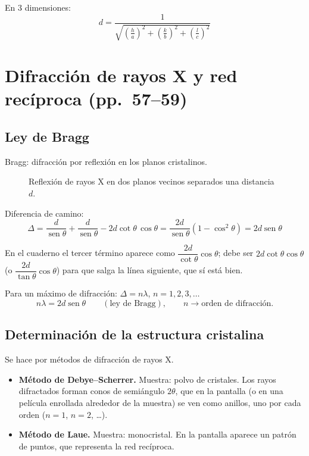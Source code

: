 \documentclass[11pt,a4paper]{article}
\newcommand{\pags}[1]{{\normalfont\small\color{gris}(pp.~#1)}}
\DeclareMathOperator{\sen}{sen}
\begin{document}
En 3 dimensiones:
\[
\boxed{d=\frac{1}{\sqrt{\left(\frac ha\right)^2+\left(\frac kb\right)^2+\left(\frac lc\right)^2}}}
\]

\section{Difracción de rayos X y red recíproca \pags{57--59}}

\subsection{Ley de Bragg}
Bragg: difracción por reflexión en los planos cristalinos.

\begin{figure}[H]
\centering
{}
\caption{Reflexión de rayos X en dos planos vecinos separados una distancia $d$.}
\end{figure}

Diferencia de camino:
\[
\Delta=\frac{d}{\sen\theta}+\frac{d}{\sen\theta}-2d\cot\theta\,\cos\theta=\frac{2d}{\sen\theta}(1-\cos^2\theta)=2d\sen\theta
\]

\begin{obs}
En el cuaderno el tercer término aparece como $\dfrac{2d}{\cot\theta}\cos\theta$; debe ser $2d\cot\theta\cos\theta$ (o
$\dfrac{2d}{\tan\theta}\cos\theta$) para que salga la línea siguiente, que sí está bien.
\end{obs}

Para un máximo de difracción: $\Delta=n\lambda$, $n=1,2,3,\ldots$
\[
\boxed{n\lambda=2d\sen\theta}\qquad(\text{ley de Bragg}),\qquad n\rightarrow\text{orden de difracción.}
\]

\subsection{Determinación de la estructura cristalina}
Se hace por métodos de difracción de rayos X.
\begin{itemize}
  \item \textbf{Método de Debye--Scherrer.} Muestra: polvo de cristales. Los rayos difractados forman conos de semiángulo
        $2\theta$, que en la pantalla (o en una película enrollada alrededor de la muestra) se ven como anillos, uno por cada
        orden ($n=1$, $n=2$, \ldots).
  \item \textbf{Método de Laue.} Muestra: monocristal. En la pantalla aparece un patrón de puntos, que representa la
        red recíproca.
\end{itemize}
\end{document}
